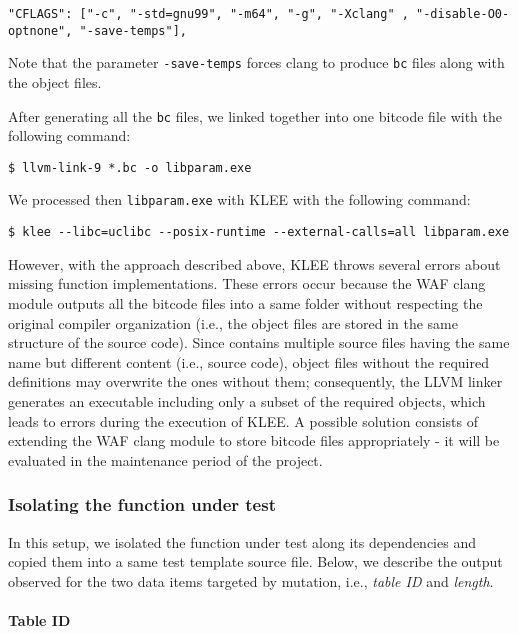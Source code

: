 \begin{lstlisting}[style=CStyle]
"CFLAGS": ["-c", "-std=gnu99", "-m64", "-g", "-Xclang" , "-disable-O0-optnone", "-save-temps"],
\end{lstlisting}

Note that the parameter \texttt{-save-temps} forces clang to produce \texttt{bc} files along with the object files.

After generating all the \texttt{bc} files, we linked together into one bitcode file with the following command:

\begin{lstlisting}[style=CStyle]
$ llvm-link-9 *.bc -o libparam.exe
\end{lstlisting}

We processed then \texttt{libparam.exe} with KLEE with the following command:

\begin{lstlisting}[style=CStyle]
$ klee --libc=uclibc --posix-runtime --external-calls=all libparam.exe
\end{lstlisting}

However, with the approach described above, KLEE throws several errors about missing function implementations. These errors occur because the WAF clang module outputs all the bitcode files into a same folder without respecting the original compiler organization (i.e., the object files are stored in the same structure of the source code). Since \PARAM contains multiple source files having the same name but different content (i.e., source code), object files without the required definitions may overwrite the ones without them; consequently, the LLVM linker generates an executable including only a subset of the required objects, which leads to errors during the execution of KLEE. A possible solution consists of extending the WAF clang module to store bitcode files appropriately - it will be evaluated in the maintenance period of the project.


\subsubsection{Isolating the function under test}

In this setup, we isolated the function under test along its dependencies and copied them into a same test template source file. Below, we describe the output observed for the two data items targeted by mutation, i.e.,
\emph{table ID} and \emph{length}.


\paragraph{Table ID}\ 

